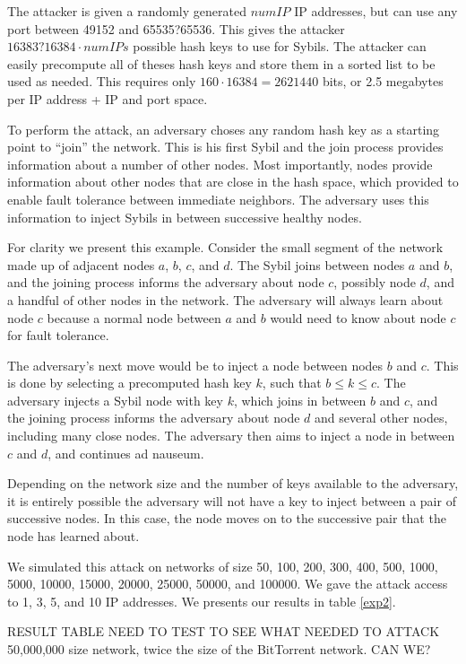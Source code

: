 \documentclass[a4paper]{IEEEtran}
\begin{document}
The attacker is given a randomly generated $numIP$ IP addresses, but can use any port between 49152 and 65535?65536.
This gives the attacker $ 16383?16384 \cdot numIPs $ possible hash keys to use for Sybils.
The attacker can easily precompute all of theses hash keys and store them in a sorted list to be used as needed.
This requires only $160 \cdot 16384 = 2621440$  bits, or 2.5 megabytes per IP address + IP and port space.

To perform the attack, an adversary choses any random hash key as a starting point to ``join'' the network.
This is his first Sybil and the join process provides information about a number of other nodes.
Most importantly,  nodes provide information about other nodes that are close in the hash space, which provided to enable fault tolerance between immediate neighbors.
The adversary uses this information to inject Sybils in between successive healthy nodes.


For clarity we present this example. 
Consider the small segment of the network made up of adjacent nodes $a$, $b$, $c$, and $d$.
The Sybil joins between nodes $a$ and $b$, and the joining process informs the adversary about node $c$, possibly node $d$, and a handful of other nodes in the network.
The adversary will always learn about node $c$ because a normal node between $a$ and $b$ would need to know about node $c$ for fault tolerance.

The adversary's next move would be to inject a node between nodes $b$ and $c$.
This is done by selecting a precomputed hash key $k$, such that $b \leq k \leq c$.
The adversary injects a Sybil node with key $k$, which joins in between $b$ and $c$, and the joining process informs the adversary about node $d$ and several other nodes, including many close nodes.
The adversary then aims to inject a node in between $c$ and $d$, and continues ad nauseum.

Depending on the network size and the number of keys available to the adversary, it is entirely possible the adversary will not have a key to inject between a pair of successive nodes.
In this case, the node moves on to the successive pair that the node has learned about.


We simulated this attack on networks of size 50, 100, 200, 300, 400, 500, 1000, 5000, 10000, 15000, 20000, 25000, 50000, and 100000.
We gave the attack access to 1, 3, 5, and 10 IP addresses.
We presents our results in table \ref{exp2}.

RESULT TABLE 
NEED TO TEST TO SEE WHAT NEEDED TO ATTACK 50,000,000 size network, twice the size of the BitTorrent network.  CAN WE?
\end{document}
